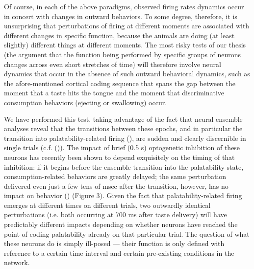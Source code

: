 \begin{refsection}
Of course, in each of the above paradigms, observed firing rates dynamics occur in concert with changes in outward behaviors. To some degree, therefore, it is unsurprising that perturbations of firing at different moments are associated with different changes in specific function, because the animals are doing (at least slightly) different things at different moments. The most risky tests of our thesis (the argument that the function being performed by specific groups of neurons changes across even short stretches of time) will therefore involve neural dynamics that occur in the absence of such outward behavioral dynamics, such as the afore-mentioned cortical coding sequence that spans the gap between the moment that a taste hits the tongue and the moment that discriminative consumption behaviors (ejecting or swallowing) occur.

We have performed this test, taking advantage of the fact that neural ensemble analyses reveal that the transitions between these epochs, and in particular the transition into palatability-related firing (\cite{sadacca2016a}), are sudden and clearly discernible in single trials (c.f. (\cite{jones2007a})). The impact of brief (0.5 s) optogenetic inhibition of these neurons has recently been shown to depend exquisitely on the timing of that inhibition: if it begins before the ensemble transition into the palatability state, consumption-related behaviors are greatly delayed; the same perturbation delivered even just a few tens of msec after the transition, however, has no impact on behavior (\cite{mukherjee2019a}) (Figure 3). Given the fact that palatability-related firing emerges at different times on different trials, two outwardly identical perturbations (i.e. both occurring at 700 ms after taste delivery) will have predictably different impacts depending on whether neurons have reached the point of coding palatability already on that particular trial. The question of what these neurons do is simply ill-posed — their function is only defined with reference to a certain time interval and certain pre-existing conditions in the network.


\end{refsection}
